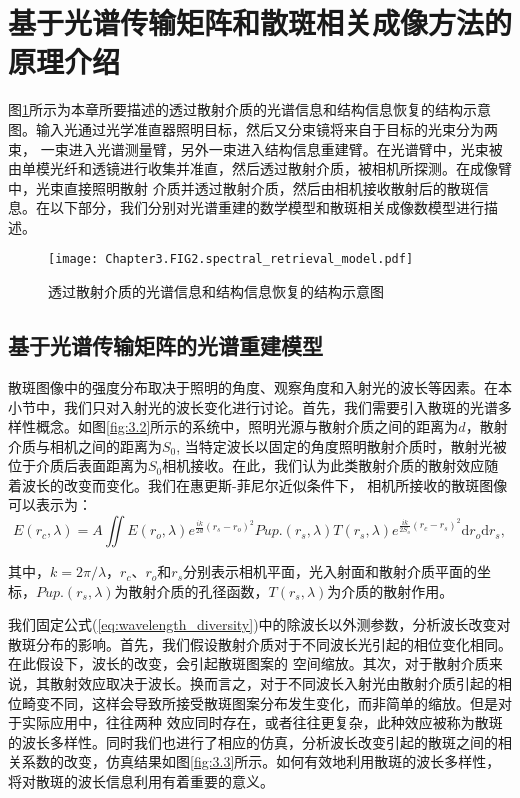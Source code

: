\section{基于光谱传输矩阵和散斑相关成像方法的原理介绍}
图\ref{fig:3.1}所示为本章所要描述的透过散射介质的光谱信息和结构信息恢复的结构示意图。输入光通过光学准直器照明目标，然后又分束镜将来自于目标的光束分为两束，
一束进入光谱测量臂，另外一束进入结构信息重建臂。在光谱臂中，光束被由单模光纤和透镜进行收集并准直，然后透过散射介质，被相机所探测。在成像臂中，光束直接照明散射
介质并透过散射介质，然后由相机接收散射后的散斑信息。在以下部分，我们分别对光谱重建的数学模型和散斑相关成像数模型进行描述。
\begin{figure}[htp]
	\centering
	\texttt{[image: Chapter3.FIG2.spectral\_retrieval\_model.pdf]}
	\caption{透过散射介质的光谱信息和结构信息恢复的结构示意图}
	\label{fig:3.1}
\end{figure}

\subsection{基于光谱传输矩阵的光谱重建模型}
散斑图像中的强度分布取决于照明的角度、观察角度和入射光的波长等因素。在本小节中，我们只对入射光的波长变化进行讨论。首先，我们需要引入散斑的光谱多样性概念。如图\ref{fig:3.2}所示的系统中，照明光源与散射介质之间的距离为$d$，散射介质与相机之间的距离为$S_{0}$,
当特定波长以固定的角度照明散射介质时，散射光被位于介质后表面距离为$S_{0}$相机接收。在此，我们认为此类散射介质的散射效应随着波长的改变而变化。我们在惠更斯-菲尼尔近似条件下，
相机所接收的散斑图像可以表示为：
\begin{equation}
    E(r_{c},\lambda) = A\iint E(r_{o},\lambda)e^{\frac{ik}{2d}(r_{s}-r_{o})^{2}}Pup.(r_{s},\lambda)T(r_{s},\lambda)e^{\frac{ik}{2S_{o}}(r_{c}-r_{s})^{2}}\mathrm{d}{r_{o}}\mathrm{d}{r_{s}}
\label{eq:wavelength_diversity},
\end{equation}

其中，$k =2\pi/\lambda$，$r_{c}$、$r_{o}$和$r_{s}$分别表示相机平面，光入射面和散射介质平面的坐标，$Pup.(r_{s},\lambda)$为散射介质的孔径函数，$T(r_{s},\lambda)$为介质的散射作用。

我们固定公式(\ref{eq:wavelength_diversity})中的除波长以外测参数，分析波长改变对散斑分布的影响。首先，我们假设散射介质对于不同波长光引起的相位变化相同。在此假设下，波长的改变，会引起散斑图案的
空间缩放。其次，对于散射介质来说，其散射效应取决于波长。换而言之，对于不同波长入射光由散射介质引起的相位畸变不同，这样会导致所接受散斑图案分布发生变化，而非简单的缩放。但是对于实际应用中，往往两种
效应同时存在，或者往往更复杂，此种效应被称为散斑的波长多样性。同时我们也进行了相应的仿真，分析波长改变引起的散斑之间的相关系数的改变，仿真结果如图\ref{fig:3.3}所示。如何有效地利用散斑的波长多样性，将对散斑的波长信息利用有着重要的意义。

